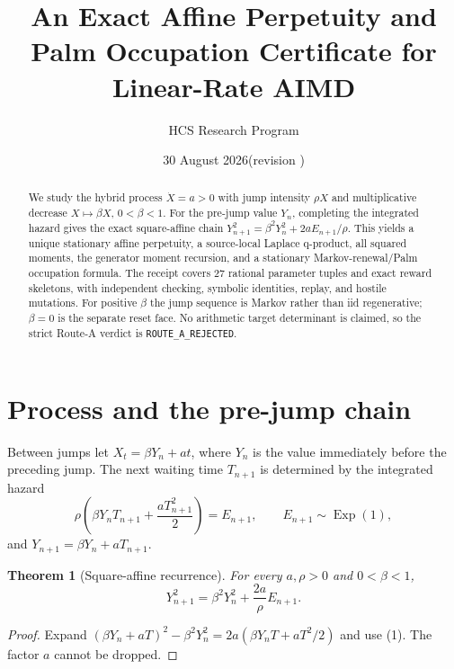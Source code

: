 \documentclass[10pt]{article}
\title{An Exact Affine Perpetuity and Palm Occupation Certificate for Linear-Rate AIMD}
\author{HCS Research Program}
\date{30 August 2026\quad (revision \CRevisionRound)}
\newtheorem{theorem}{Theorem}
\begin{document}
\maketitle
\begin{abstract}
We study the hybrid process \(\dot X=a>0\) with jump intensity \(\rho X\) and
multiplicative decrease \(X\mapsto\beta X\), \(0<\beta<1\).  For the
pre-jump value \(Y_n\), completing the integrated hazard gives the exact
square-affine chain \(Y_{n+1}^2=\beta^2Y_n^2+2aE_{n+1}/\rho\).  This yields a
unique stationary affine perpetuity, a source-local Laplace q-product, all
squared moments, the generator moment recursion, and a stationary
Markov-renewal/Palm occupation formula.  The receipt covers 27 rational
parameter tuples and exact reward skeletons, with independent checking,
symbolic identities, replay, and hostile mutations.  For positive \(\beta\)
the jump sequence is Markov rather than iid regenerative; \(\beta=0\) is the
separate reset face.  No arithmetic target determinant is claimed, so the
strict Route-A verdict is \texttt{ROUTE\_A\_REJECTED}.
\end{abstract}

\section{Process and the pre-jump chain}
Between jumps let \(X_t=\beta Y_n+at\), where \(Y_n\) is the value immediately
before the preceding jump.  The next waiting time \(T_{n+1}\) is determined by
the integrated hazard
\begin{equation}
 \rho\left(\beta Y_nT_{n+1}+\frac{aT_{n+1}^2}{2}\right)=E_{n+1},
 \qquad E_{n+1}\sim\operatorname{Exp}(1),
 \tag{1}
\end{equation}
and \(Y_{n+1}=\beta Y_n+aT_{n+1}\).

\begin{theorem}[Square-affine recurrence]
For every \(a,\rho>0\) and \(0<\beta<1\),
\begin{equation}
 Y_{n+1}^2=\beta^2Y_n^2+\frac{2a}{\rho}E_{n+1}. \tag{2}
\end{equation}
\end{theorem}
\begin{proof}
Expand \((\beta Y_n+aT)^2-\beta^2Y_n^2=2a(\beta Y_nT+aT^2/2)\) and use (1).
The factor \(a\) cannot be dropped.  \end{proof}
\end{document}
